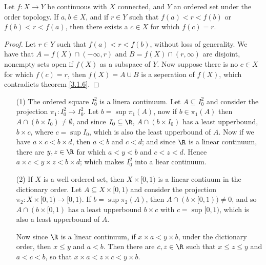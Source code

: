 \begin{theorem}\label{3.2.2}
    Let $f:X \rightarrow Y$ be continuous with  $X$ connected, and  $Y$ an ordered set under the
    order topology. If  $a,b \in X$, and if  $r \in Y$ such that  $f(a)<r<f(b)$ or $f(b)<r<f(a)$,
    then there exists a $c \in X$ for which  $f(c)=r$.
\end{theorem}
\begin{proof}
    Let $r \in Y$ such that  $f(a)<r<f(b)$, without loss of generality. We have that $A=f(X) \cap
    (-\infty, r)$ and $B=f(X) \cap (r ,\infty)$ are disjoint, nonempty sets open if $f(X)$ as a
    subspace of $Y$. Now suppose there is no  $c \in X$ for which  $f(c)=r$, then $f(X)=A \cup B$ is
    a seperation of $f(X)$, which contradicts theorem \ref{3.1.6}.
\end{proof}

\begin{example}
    \begin{enumerate}
        \item[(1)] The ordered square $I_0^2$ is a linera continuum. Let $A \subseteq I_0^2$ and consider
            the projection $\pi_1:I_0^2 \rightarrow I_0^2$. Let $b=\sup{\pi_1(A)}$, now if $b \in
            \pi_1(A)$ then $A \cap (b \times I_0) \neq \emptyset$, and since $I_0 \subseteq \R$, $A
            \cap (b \times I_0)$ has a least upperbound, $b \times c$, where  $c=\sup{I_0}$, which
            is also the least upperbound of $A$. Now if we have $a \times c < b \times d$, then
            $a<b$ and  $c<d$; and since  $\R$ is a linear continuum, there are $y,z \in \R$ for
            which  $a<y<b$ and  $c<z<d$. Hence  $a \times c < y \times z < b \times d$; which makes
            $ I_0^2$ into a liear continuum.

        \item[(2)] If $X$ is a well ordered set, then  $X \times [0,1)$ is a linear contiuum in the
            dictionary order. Let $A \subseteq X \times [0,1)$ and consider the projection $\pi_2:X
            \times [0,1) \rightarrow [0,1)$. If $b=\sup{\pi_2(A)}$, then $A \cap (b \times [0,1)) \neq
            0$, and so $A \cap (b \times [0,1)$ has a least upperbound $b \times c$ with
            $c=\sup{[0,1)}$, which is also a least upperbound of $A$.

            Now since $\R$ is a linear continuum, if $x \times a < y \times b$, under the dictionary
            order, then  $x \leq y$ and  $a<b$. Then there are  $c,z \in \R$ such that  $x \leq z
            \leq y$ and  $a<c<b$, so that $x \times a < z \times c < y \times b$.
    \end{enumerate}
\end{example}

